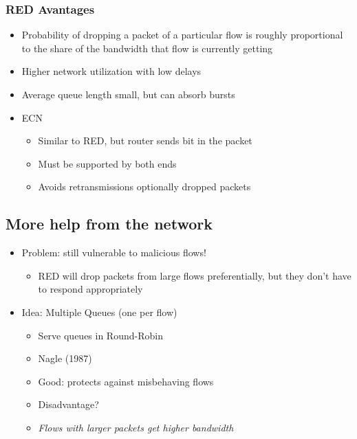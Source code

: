 \subsubsection{RED Avantages}
\begin{itemize}[nosep]
    \item Probability of dropping a packet of a particular flow is roughly proportional to the share of the bandwidth that flow is currently getting
    \item Higher network utilization with low delays
    \item Average queue length small, but can absorb bursts
    \item ECN
          \begin{itemize}[nosep]
              \item Similar to RED, but router sends bit in the packet
              \item Must be supported by both ends
              \item Avoids retransmissions optionally dropped packets
          \end{itemize}
\end{itemize}
\subsection{More help from the network}
\begin{itemize}[nosep]
    \item Problem: still vulnerable to malicious flows!
          \begin{itemize}[nosep]
              \item RED will drop packets from large flows preferentially, but they don't have to respond appropriately
          \end{itemize}
    \item Idea: Multiple Queues (one per flow)
          \begin{itemize}[nosep]
              \item Serve queues in Round-Robin
              \item Nagle (1987)
              \item Good: protects against misbehaving flows
              \item Disadvantage?
              \item \emph{Flows with larger packets get higher bandwidth}
          \end{itemize}
\end{itemize}
